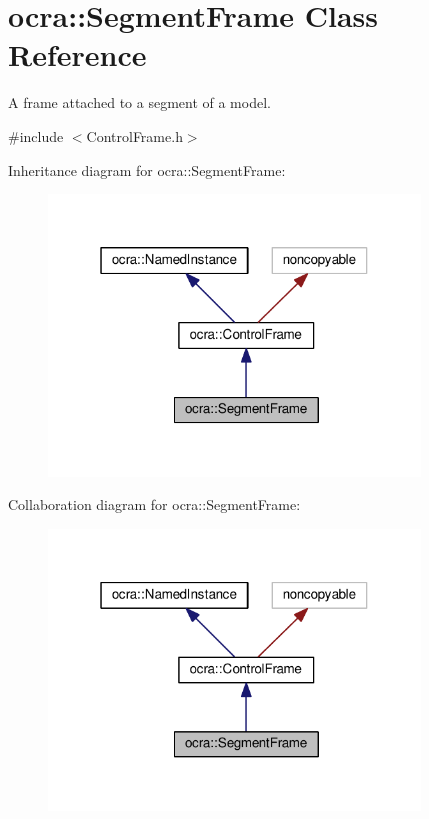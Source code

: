 \hypertarget{classocra_1_1SegmentFrame}{}\section{ocra\+:\+:Segment\+Frame Class Reference}
\label{classocra_1_1SegmentFrame}


A frame attached to a segment of a model.  




{\ttfamily \#include $<$Control\+Frame.\+h$>$}



Inheritance diagram for ocra\+:\+:Segment\+Frame\+:
\nopagebreak
\begin{figure}[H]
\begin{center}
\leavevmode
\includegraphics[width=280pt]{d0/d24/classocra_1_1SegmentFrame__inherit__graph}
\end{center}
\end{figure}


Collaboration diagram for ocra\+:\+:Segment\+Frame\+:
\nopagebreak
\begin{figure}[H]
\begin{center}
\leavevmode
\includegraphics[width=280pt]{dc/d5a/classocra_1_1SegmentFrame__coll__graph}
\end{center}
\end{figure}
